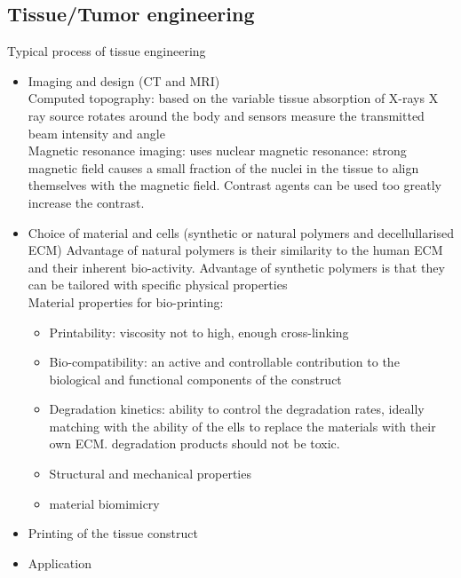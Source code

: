 \documentclass{article}
\begin{document}
\subsection{Tissue/Tumor engineering}
Typical process of tissue engineering
\begin{itemize}
    \item Imaging and design (CT and MRI)\\
    Computed topography: based on the variable tissue absorption of X-rays
    X ray source rotates around the body and sensors measure the transmitted beam intensity and angle\\
    
    Magnetic resonance imaging: uses nuclear magnetic resonance: strong magnetic field causes a small fraction of the nuclei in the tissue to align themselves with the magnetic field. Contrast agents can be used too greatly increase the contrast.
    \item Choice of material and cells (synthetic or natural polymers and decellullarised ECM)
    Advantage of natural polymers is their similarity to the human ECM and their inherent bio-activity. Advantage of synthetic polymers is that they can be tailored with specific physical properties\\

    Material properties for bio-printing:
    \begin{itemize}
        \item Printability: viscosity not to high, enough cross-linking
        \item Bio-compatibility: an active and controllable contribution to the biological and functional components of the construct
        \item Degradation kinetics: ability to control the degradation rates, ideally matching with the ability of the ells to replace the materials with their own ECM. degradation products should not be toxic.
        \item Structural and mechanical properties
        \item material biomimicry
    \end{itemize}
    \item Printing of the tissue construct
    \item Application
\end{itemize}
\end{document}
